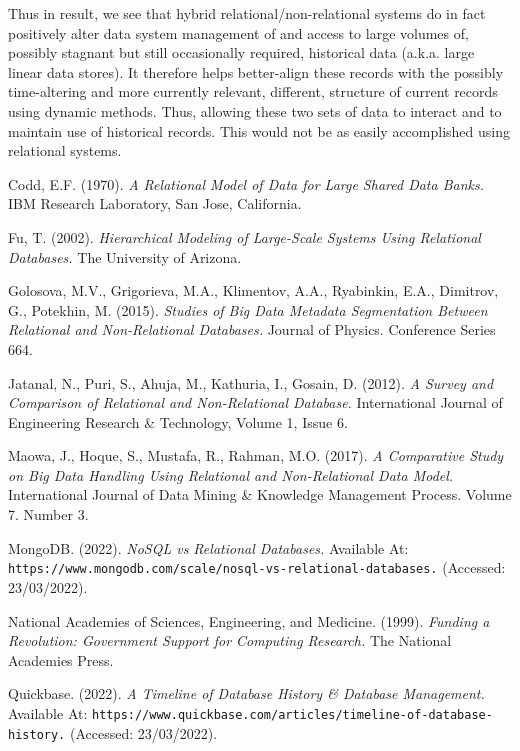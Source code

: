 \documentclass[11pt, english]{article}
\begin{document}
	Thus in result, we see that hybrid relational/non-relational systems do in fact positively alter data system management of and access to large volumes of, possibly stagnant but still occasionally required, historical data (a.k.a. large linear data stores). It therefore helps better-align these records with the possibly time-altering and more currently relevant, different, structure of current records using dynamic methods. Thus, allowing these two sets of data to interact and to maintain use of historical records. This would not be as easily accomplished using relational systems.\\

\newpage


\renewcommand\refname{Bibliography}

\begin{thebibliography}{9}

        \bibitem{}
                Codd, E.F. (1970).
		\textsl{A Relational Model of Data for Large Shared Data Banks.}
		IBM Research Laboratory, San Jose, California.

        \bibitem{}
                Fu, T. (2002).
		\textsl{Hierarchical Modeling of Large-Scale Systems Using Relational Databases.}
		The University of Arizona.

        \bibitem{}
                Golosova, M.V., Grigorieva, M.A., Klimentov, A.A., Ryabinkin, E.A., Dimitrov, G., Potekhin, M. (2015).
		\textsl{Studies of Big Data Metadata Segmentation Between Relational and Non-Relational Databases.}
		Journal of Physics. Conference Series 664.

        \bibitem{}
                Jatanal, N., Puri, S., Ahuja, M., Kathuria, I., Gosain, D. (2012).
                \textsl{A Survey and Comparison of Relational and Non-Relational Database.}
                International Journal of Engineering Research \& Technology, Volume 1, Issue 6.

        \bibitem{}
                Maowa, J., Hoque, S., Mustafa, R., Rahman, M.O. (2017).
		\textsl{A Comparative Study on Big Data Handling Using Relational and Non-Relational Data Model.}
		International Journal of Data Mining \& Knowledge Management Process. Volume 7. Number 3.

        \bibitem{}
                MongoDB. (2022).
                \textsl{NoSQL vs Relational Databases.}
		Available At:
		\texttt{https://www.mongodb.com/scale/nosql-vs-relational-databases.}
		(Accessed: 23/03/2022).

        \bibitem{}
                National Academies of Sciences, Engineering, and Medicine. (1999).
		\textsl{Funding a Revolution: Government Support for Computing Research.}
		The National Academies Press.

        \bibitem{}
                Quickbase. (2022).
                \textsl{A Timeline of Database History \& Database Management.}
		Available At:
		\texttt{https://www.quickbase.com/articles/timeline-of-database-history.}
		(Accessed: 23/03/2022).

\end{thebibliography}
\end{document}
